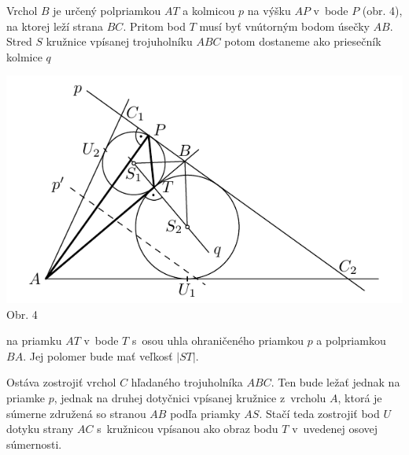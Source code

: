 \rieh Vrchol $B$ je určený polpriamkou $AT$ a kolmicou $p$ na výšku $AP$ v~bode $P$ (obr. 4), na ktorej leží strana $BC$. Pritom bod $T$ musí byť vnútorným bodom úsečky $AB$. Stred $S$ kružnice vpísanej trojuholníku $ABC$ potom dostaneme ako priesečník kolmice $q$
\begin{center}
\includegraphics{obrazky/63D2}\\

Obr. 4
\end{center}
na priamku $AT$ v~bode $T$ s~osou uhla ohraničeného priamkou $p$ a polpriamkou $BA$. Jej polomer bude mať veľkosť $|ST|$.

Ostáva zostrojiť vrchol $C$ hľadaného trojuholníka $ABC$. Ten bude ležať jednak na priamke $p$, jednak na druhej dotyčnici vpísanej kružnice z~vrcholu $A$, ktorá je súmerne združená so stranou $AB$ podľa priamky $AS$. Stačí teda zostrojiť bod $U$ dotyku strany $AC$ s~kružnicou vpísanou ako obraz bodu $T$ v~uvedenej osovej súmernosti.

